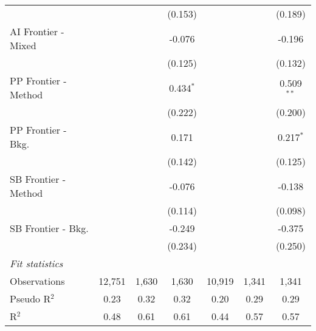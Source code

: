 \begin{tabular}{lcccccc}
                        &             &             & (0.153)     &              &               & (0.189)\\   
   AI Frontier - Mixed  &             &             & -0.076      &              &               & -0.196\\   
                        &             &             & (0.125)     &              &               & (0.132)\\   
   PP Frontier - Method &             &             & 0.434$^{*}$ &              &               & 0.509$^{**}$\\   
                        &             &             & (0.222)     &              &               & (0.200)\\   
   PP Frontier - Bkg.   &             &             & 0.171       &              &               & 0.217$^{*}$\\   
                        &             &             & (0.142)     &              &               & (0.125)\\   
   SB Frontier - Method &             &             & -0.076      &              &               & -0.138\\   
                        &             &             & (0.114)     &              &               & (0.098)\\   
   SB Frontier - Bkg.   &             &             & -0.249      &              &               & -0.375\\   
                        &             &             & (0.234)     &              &               & (0.250)\\   
   \midrule
   \emph{Fit statistics}\\
   Observations         & 12,751      & 1,630       & 1,630       & 10,919       & 1,341         & 1,341\\  
   Pseudo R$^2$         & 0.23        & 0.32        & 0.32        & 0.20         & 0.29          & 0.29\\  
   R$^2$                & 0.48        & 0.61        & 0.61        & 0.44         & 0.57          & 0.57\\  
   

\end{tabular}
